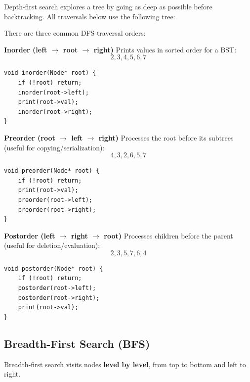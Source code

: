 \documentclass{article}
\begin{document}
Depth-first search explores a tree by going as deep as possible before backtracking.  
All traversals below use the following tree:

\begin{center}
\end{center}

There are three common DFS traversal orders:

\textbf{Inorder (left $\rightarrow$ root $\rightarrow$ right)}  
Prints values in sorted order for a BST:
\[
2, 3, 4, 5, 6, 7
\]

\begin{verbatim}
void inorder(Node* root) {
    if (!root) return;
    inorder(root->left);
    print(root->val);
    inorder(root->right);
}
\end{verbatim}

\textbf{Preorder (root $\rightarrow$ left $\rightarrow$ right)}  
Processes the root before its subtrees (useful for copying/serialization):
\[
4, 3, 2, 6, 5, 7
\]

\begin{verbatim}
void preorder(Node* root) {
    if (!root) return;
    print(root->val);
    preorder(root->left);
    preorder(root->right);
}
\end{verbatim}

\textbf{Postorder (left $\rightarrow$ right $\rightarrow$ root)}  
Processes children before the parent (useful for deletion/evaluation):
\[
2, 3, 5, 7, 6, 4
\]

\begin{verbatim}
void postorder(Node* root) {
    if (!root) return;
    postorder(root->left);
    postorder(root->right);
    print(root->val);
}
\end{verbatim}

\subsection{Breadth-First Search (BFS)}

Breadth-first search visits nodes \textbf{level by level}, from top to bottom and left to right.
\end{document}
